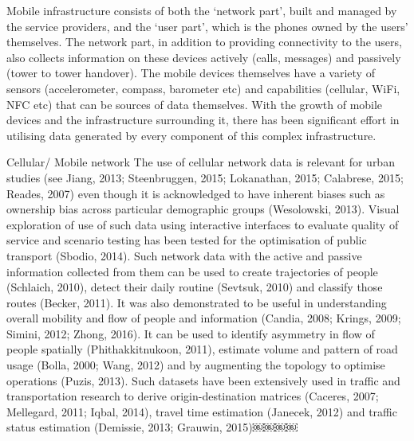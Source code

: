  Mobile infrastructure consists of both the ‘network part’, built and managed by the service providers, and the ‘user part’, which is the phones owned by the users’ themselves. The network part, in addition to providing connectivity to the users, also collects information on these devices actively (calls, messages) and passively (tower to tower handover). The mobile devices themselves have a variety of sensors (accelerometer, compass, barometer etc) and capabilities (cellular, WiFi, NFC etc) that can be sources of data themselves. With the growth of mobile devices and the infrastructure surrounding it, there has been significant effort in utilising data generated by every component of this complex infrastructure.

 Cellular/ Mobile network
 The use of cellular network data is relevant for urban studies (see Jiang, 2013; Steenbruggen, 2015; Lokanathan, 2015; Calabrese, 2015; Reades, 2007) even though it is acknowledged to have inherent biases such as ownership bias across particular demographic groups (Wesolowski, 2013). Visual exploration of use of such data using interactive interfaces to evaluate quality of service and scenario testing has been tested for the optimisation of public transport (Sbodio, 2014). Such network data with the active and passive information collected from them can be used to create trajectories of people (Schlaich, 2010), detect their daily routine (Sevtsuk, 2010) and classify those routes (Becker, 2011). It was also demonstrated to be useful in understanding overall mobility and flow of people and information (Candia, 2008; Krings, 2009; Simini, 2012; Zhong, 2016). It can be used to identify asymmetry in flow of people spatially (Phithakkitnukoon, 2011), estimate volume and pattern of road usage (Bolla, 2000; Wang, 2012) and by augmenting the topology to optimise operations (Puzis, 2013). Such datasets have been extensively used in traffic and transportation research to derive origin-destination matrices (Caceres, 2007; Mellegard, 2011; Iqbal, 2014), travel time estimation (Janecek, 2012) and traffic status estimation (Demissie, 2013; Grauwin, 2015)￼￼￼￼

